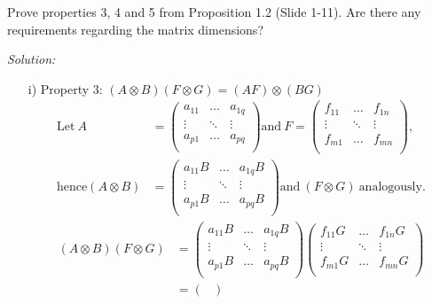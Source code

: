 \documentclass[12pt,a4paper]{article}
\begin{document}
Prove properties 3, 4 and 5 from Proposition 1.2 (Slide 1-11). Are there
any requirements regarding the matrix dimensions?

\emph{Solution:}\\

\begin{itemize}
    \item[i)] Property 3: $(A \otimes B)(F \otimes G) = (AF) \otimes (BG)$
    \begin{align*}
      \text{Let} \ A & = 
      \begin{pmatrix}
      a_{11} & \ldots & a_{1q}\\
      \vdots & \ddots & \vdots \\
      a_{p1} & \ldots & a_{pq}\\
      \end{pmatrix}
      \text{and} \ F = 
      \begin{pmatrix}
      f_{11} & \ldots & f_{1n}\\
      \vdots & \ddots & \vdots \\
      f_{m1} & \ldots & f_{mn}\\
      \end{pmatrix},\\
      \text{hence} (A \otimes B) & = 
      \begin{pmatrix}
      a_{11}B & \ldots & a_{1q}B\\
      \vdots & \ddots & \vdots \\
      a_{p1}B & \ldots & a_{pq}B\\
      \end{pmatrix}
      \text{and} \ (F \otimes G) \ \text{analogously}. 
    \end{align*}
    \begin{align*}
    (A \otimes B)(F \otimes G) & = 
    \begin{pmatrix}
      a_{11}B & \ldots & a_{1q}B\\
      \vdots & \ddots & \vdots \\
      a_{p1}B & \ldots & a_{pq}B\\
    \end{pmatrix}
    \begin{pmatrix}
      f_{11}G & \ldots & f_{1n}G\\
      \vdots & \ddots & \vdots \\
      f_{m1}G & \ldots & f_{mn}G\\
    \end{pmatrix}\\
    & = 
    \begin{pmatrix}

\end{pmatrix}
\end{align*}
\end{itemize}
\end{document}
